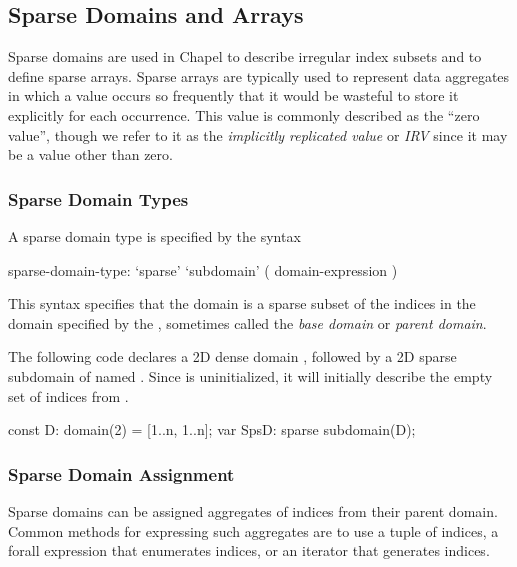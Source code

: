 \subsection{Sparse Domains and Arrays}
\label{Sparse_Domains_and_Arrays}

Sparse domains are used in Chapel to describe irregular index subsets
and to define sparse arrays.  Sparse arrays are typically used to
represent data aggregates in which a value occurs so frequently that
it would be wasteful to store it explicitly for each occurrence.  This
value is commonly described as the ``zero value'', though we refer to
it as the \emph{implicitly replicated value} or \emph{IRV} since it
may be a value other than zero.

\subsubsection{Sparse Domain Types}

A sparse domain type is specified by the syntax
\begin{syntax}
sparse-domain-type:
  `sparse' `subdomain' ( domain-expression )
\end{syntax}
This syntax specifies that the domain is a sparse subset of the
indices in the domain specified by the ,
sometimes called the \emph{base domain} or \emph{parent domain}.

\begin{example}
The following code declares a 2D dense domain , followed by a
2D sparse subdomain of  named .  Since 
is uninitialized, it will initially describe the empty set of indices
from .
\begin{chapel}
const D: domain(2) = [1..n, 1..n];
var SpsD: sparse subdomain(D);
\end{chapel}
\end{example}


\subsubsection{Sparse Domain Assignment}

Sparse domains can be assigned aggregates of indices from their parent
domain.  Common methods for expressing such aggregates are to use a
tuple of indices, a forall expression that enumerates indices, or an
iterator that generates indices.

